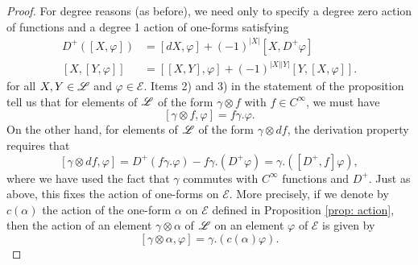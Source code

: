 \documentclass[11pt]{amsart}
\newcommand{\E}{\mscr{E}}
\newcommand{\mscr}{\mathscr}
\numberwithin{equation}{section}
\newcommand{\cinfty}{C^{\infty}}
\begin{document}
\begin{proof}
For degree reasons (as before), we need only to specify a degree zero action of functions and a degree 1 action of one-forms satisfying
\begin{align*}
D^+([X,\varphi]) &= [dX,\varphi] +(-1)^{|X|}[X,D^+\varphi]\\
[X,[Y,\varphi]] &= [[X,Y],\varphi] +(-1)^{|X||Y|}[Y,[X,\varphi]].
\end{align*}
for all $X,Y\in \mathscr L$ and $\varphi \in \E$. Items 2) and 3) in the statement of the proposition tell us that for elements of $\mathscr L$ of the form $\gamma \otimes f$ with $f\in \cinfty$, we must have
\[
[\gamma\otimes f, \varphi] = f\gamma.\varphi.
\]
On the other hand, for elements of $\mathscr L$ of the form $\gamma\otimes df$, the derivation property requires that
\begin{equation}
\label{eq: 0form}
[\gamma\otimes df,\varphi]= D^+(f\gamma.\varphi)-f\gamma.(D^+\varphi)=\gamma.([D^+,f]\varphi),
\end{equation}
where we have used the fact that $\gamma$ commutes with $\cinfty$ functions and $D^+$. Just as above, this fixes the action of one-forms on $\E$. More precisely, if we denote by $c(\alpha)$ the action of the one-form $\alpha$ on $\E$ defined in Proposition \ref{prop: action}, then the action of an element $\gamma\otimes \alpha$ of $\mathscr L$ on an element $\varphi$ of $\E$ is given by
\begin{equation}
\label{eq: 1form}
[\gamma\otimes \alpha, \varphi] = \gamma.(c(\alpha)\varphi).
\end{equation}


\end{proof}
\end{document}

